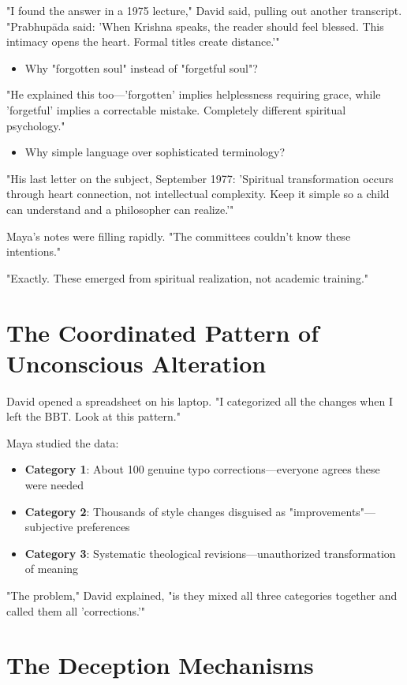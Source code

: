 \documentclass[11pt,twoside]{book}
\begin{document}
"I found the answer in a 1975 lecture," David said, pulling out another transcript. "Prabhupāda said: 'When Krishna speaks, the reader should feel blessed. This intimacy opens the heart. Formal titles create distance.'"

\begin{itemize}
\item Why "forgotten soul" instead of "forgetful soul"?
\end{itemize}

"He explained this too—'forgotten' implies helplessness requiring grace, while 'forgetful' implies a correctable mistake. Completely different spiritual psychology."

\begin{itemize}
\item Why simple language over sophisticated terminology?
\end{itemize}

"His last letter on the subject, September 1977: 'Spiritual transformation occurs through heart connection, not intellectual complexity. Keep it simple so a child can understand and a philosopher can realize.'"

Maya's notes were filling rapidly. "The committees couldn't know these intentions."

"Exactly. These emerged from spiritual realization, not academic training."
\section*{The Coordinated Pattern of Unconscious Alteration}
\label{sec:orgbf36078}

David opened a spreadsheet on his laptop. "I categorized all the changes when I left the BBT. Look at this pattern."

Maya studied the data:
\begin{itemize}
\item \textbf{\textbf{Category 1}}: About 100 genuine typo corrections—everyone agrees these were needed
\item \textbf{\textbf{Category 2}}: Thousands of style changes disguised as "improvements"—subjective preferences
\item \textbf{\textbf{Category 3}}: Systematic theological revisions—unauthorized transformation of meaning
\end{itemize}

"The problem," David explained, "is they mixed all three categories together and called them all 'corrections.'"
\section*{The Deception Mechanisms}
\label{sec:orgd685d83}
\end{document}
